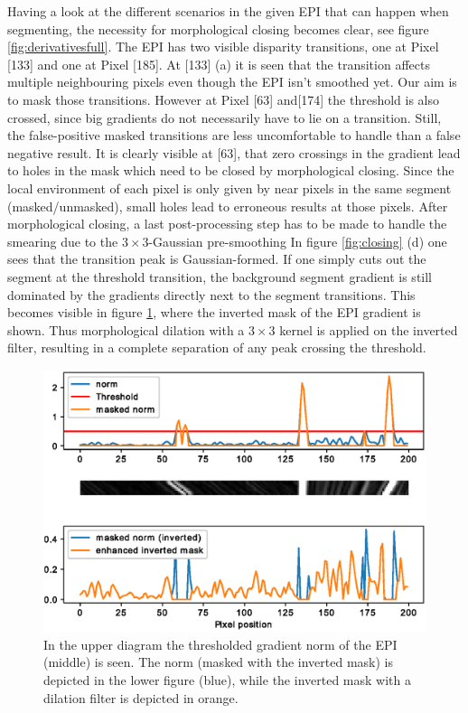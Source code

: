 \documentclass  [
  paper    = a4,
  BCOR     = 10mm,
  twoside,
  fontsize = 12pt,
  fleqn,
  toc      = bibnumbered,
  toc      = listofnumbered,
  numbers  = noendperiod,
  headings = normal,
  listof   = leveldown,
  version  = 3.03
]                                       {scrreprt}
\begin{document}
 Having a look at the different scenarios in the given EPI that can happen when segmenting, the necessity for morphological closing becomes clear, see figure \ref{fig:derivativesfull}. The EPI has two visible disparity transitions, one at Pixel [133] and one at Pixel [185]. At [133] (a) it is seen that the transition affects multiple neighbouring pixels even though the EPI isn't smoothed yet. Our aim is to mask those transitions. However at Pixel [63] and[174] the threshold is also crossed, since big gradients do not necessarily have to lie on a transition. Still, the false-positive masked transitions are less uncomfortable to handle than a false negative result. It is clearly visible at [63], that zero crossings in the gradient lead to holes in the mask which need to be closed by morphological closing. Since the local environment of each pixel is only given by near pixels in the same segment (masked/unmasked), small holes lead to erroneous results at those pixels. After morphological closing, a last post-processing step has to be made to handle the smearing due to the $3\times 3$-Gaussian pre-smoothing In figure \ref{fig:closing} (d) one sees that the transition peak is Gaussian-formed. If one simply cuts out the segment at the threshold transition, the background segment gradient is still dominated by the gradients directly next to the segment transitions. This becomes visible in figure \ref{fig:segmgaussian}, where the inverted mask of the EPI gradient is shown. Thus morphological dilation with a $3\times3$ kernel is applied on the inverted filter, resulting in a complete separation of any peak crossing the threshold.
\begin{figure}[h!]
	\centering
	\includegraphics[width=1\linewidth]{images/segm_gaussian}
	\caption[Enhanced segmentation mask]{In the upper diagram the thresholded gradient norm of the EPI (middle) is seen. The norm (masked with the inverted mask) is depicted in the lower figure (blue), while the inverted mask with a dilation filter is depicted in orange.}
	\label{fig:segmgaussian}
\end{figure}
\end{document}

